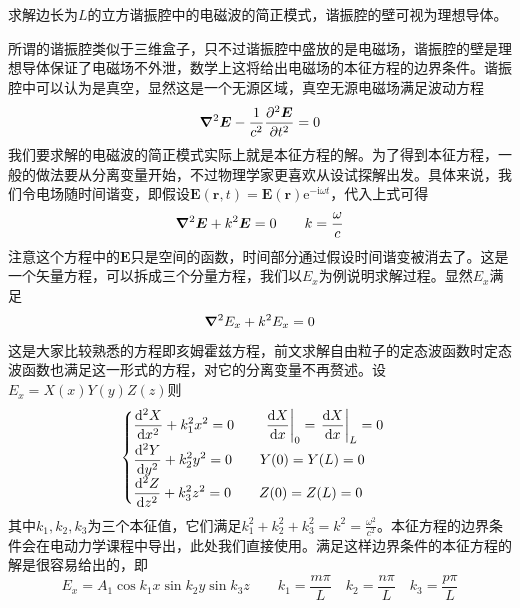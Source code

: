 \documentclass[../../main.tex]{subfiles}
\begin{document}
\begin{example}
    求解边长为\(L\)的立方谐振腔中的电磁波的简正模式，谐振腔的壁可视为理想导体。
    \begin{solution}
        所谓的谐振腔类似于三维盒子，只不过谐振腔中盛放的是电磁场，谐振腔的壁是理想导体保证了电磁场不外泄，数学上这将给出电磁场的本征方程的边界条件。谐振腔中可以认为是真空，显然这是一个无源区域，真空无源电磁场满足波动方程
        \begin{equation}
            \grad^2\bm{E}-\frac{1}{c^2}\pdv[2]{\bm{E}}{t}=0
        \end{equation}
        我们要求解的电磁波的简正模式实际上就是本征方程的解。为了得到本征方程，一般的做法要从分离变量开始，不过物理学家更喜欢从设试探解出发。具体来说，我们令电场随时间谐变，即假设\(\bm{E}(\bm{r},t)=\bm{E(\bm{r})}\mathrm{e}^{-\mathrm{i}\omega t}\)，代入上式可得
        \begin{equation}
            \grad^2\bm{E}+k^2\bm{E}=0\qquad k=\frac{\omega}{c}
        \end{equation}
        注意这个方程中的\(\bm{E}\)只是空间的函数，时间部分通过假设时间谐变被消去了。这是一个矢量方程，可以拆成三个分量方程，我们以\(E_{x}\)为例说明求解过程。显然\(E_{x}\)满足
        \begin{equation}
        \grad^2E_{x}+k^2E_{x}=0    
        \end{equation}
        这是大家比较熟悉的方程即亥姆霍兹方程，前文求解自由粒子的定态波函数时定态波函数也满足这一形式的方程，对它的分离变量不再赘述。设\(E_{x}=X(x)Y(y)Z(z)\)则
        \begin{equation}
            \begin{cases}
                \displaystyle \dv[2]{X}{x}+k_1^2x^2=0\qquad \eval{\dv{X}{x}}_{0}=\eval{\dv{X}{x}}_{L}=0 \\
                \displaystyle \displaystyle \dv[2]{Y}{y}+k_2^2y^2=0\qquad Y(0)=Y(L)=0 \\
                \displaystyle \displaystyle \dv[2]{Z}{z}+k_3^2z^2=0\qquad Z(0)=Z(L)=0
            \end{cases}
        \end{equation}
        其中\(k_1,k_2,k_3\)为三个本征值，它们满足\(k_1^2+k_2^2+k_3^2=k^2=\frac{\omega^2}{c^2}\)。本征方程的边界条件会在电动力学课程中导出，此处我们直接使用。满足这样边界条件的本征方程的解是很容易给出的，即
        \begin{equation}
            E_x=A_1\cos k_1x\sin k_2y\sin k_3z\qquad k_1=\frac{m\pi}{L}\quad k_2=\frac{n\pi}{L}\quad k_3=\frac{p\pi}{L}
        \end{equation}

\end{solution}
\end{example}
\end{document}
